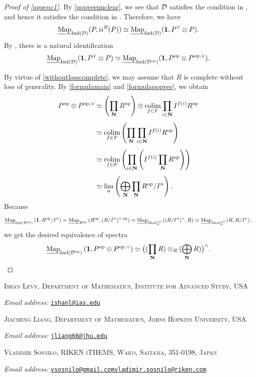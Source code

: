 \documentclass[a4paper,10pt, oneside]{amsart}
\begin{document}
\begin{proof}[Proof of \cref{appenc1}]
	By \cref{popveenuclear}, we see that $\mathcal{D}$ satisfies the  condition in \cite[Proposition 1.33]{efimov2025localizinginvariantsinverselimits}, and hence it satisfies the  condition in \cite[Proposition 1.30]{efimov2025localizinginvariantsinverselimits}. Therefore, we have $$\underline{\operatorname{Map}}_{\mathrm{Ind}(\mathcal{D})}(P,ii^R(P))\simeq \underline{\operatorname{Map}}_{\mathrm{Ind}(\mathcal{D})}(\mathbf{1},P^\vee\otimes P).$$
	By \cite[Proposition 1.31]{efimov2025localizinginvariantsinverselimits}, there is a natural identification
	$$\underline{\operatorname{Map}}_{\mathrm{Ind}(\mathcal{D})}(\mathbf{1},P^\vee\otimes P)\simeq\underline{\operatorname{Map}}_{\mathrm{Ind}(\mathcal{D}^{\mathrm{op}})}(\mathbf{1},P^{\mathrm{op}}\otimes P^{\mathrm{op},\vee}).$$
	
By virtue of \cref{withoutlosscomplete}, we may assume that $R$ is complete without loss of generality. 
By \cref{formulamain} and \cref{formulapopvee}, we obtain
\[
\begin{aligned}
	P^{\mathrm{op}}\otimes P^{\mathrm{op},\vee}
	&\simeq
	\left(\prod_{\mathbf N} R^{\mathrm{op}}\right)
	\otimes
	\operatorname*{colim}_{f\in F}
	\prod_{i\in \mathbf{N}} I^{f(i)}R^{\mathrm{op}} \\[4pt]
	&\simeq
	\operatorname*{colim}_{f\in F}
	\left(
	\prod_{\mathbf N}
	\prod_{i\in \mathbf{N}} I^{f(i)}R^{\mathrm{op}}
	\right) \\[4pt]
	&\simeq
	\operatorname*{colim}_{f\in F}
	\left(
	\prod_{i\in \mathbf{N}}
	\left(
	I^{f(i)}\prod_{\mathbf N} R^{\mathrm{op}}
	\right)
	\right) \\[4pt]
	&\simeq
	\lim_n
	\left(
	\bigoplus_{\mathbf{N}}
	\prod_{\mathbf{N}} R^{\mathrm{op}}/I^n
	\right).
\end{aligned}
\]
Because $$\underline{\operatorname{Map}}_{\mathrm{Ind}(\mathcal{D}^{\mathrm{op}})}\left(\mathbf{1},R^{\mathrm{op}}/I^n\right)=\underline{\operatorname{Map}}_{\mathcal{D}^{\mathrm{op}}}\left(R^{\mathrm{op}},(R/I^n)^{\vee,\mathrm{op}}\right)=\underline{\operatorname{Map}}_{\mathrm{Mod}_{R}^{\mathrm{cpl}}}\left((R/I^n)^{\vee},R\right)\simeq \underline{\operatorname{Map}}_{\mathrm{Mod}_{R}^{\mathrm{cpl}}}\left(R,R/I^n\right),$$
we get the desired equivalence of spectra
\[
\underline{\operatorname{Map}}_{\mathrm{Ind}(\mathcal{D}^{\mathrm{op}})}
\left(\mathbf{1},P^{\mathrm{op}}\otimes P^{\mathrm{op},\vee}\right)
\simeq
\big((\prod_{\mathbf{N}} R)\otimes_R (\bigoplus_{\mathbf{N}} R)\big)^\wedge.
\]

\end{proof}

\printbibliography
\bigskip



\textsc{Ishan Levy, Department of Mathematics, Institute for Advanced Study, USA}

\emph{Email address:} \href{mailto:ishanl@ias.edu}{\texttt{ishanl@ias.edu}}
\bigskip

\textsc{Jiacheng Liang, Department of Mathematics, Johns Hopkins University, USA}

\emph{Email address:} \href{mailto:jliang66@jhu.edu}{\texttt{jliang66@jhu.edu}}

\bigskip
\textsc{Vladimir Sosnilo, RIKEN iTHEMS, Wako, Saitama, 351-0198, Japan}

\emph{Email address:} \href{mailto:vsosnilo@gmail.com}{\texttt{vsosnilo@gmail.com}}\;\;\;\href{mailto:vladimir.sosnilo@riken.com}{\texttt{vladimir.sosnilo@riken.com}}
\end{document}
